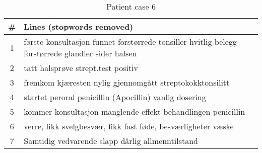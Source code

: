 \begin{table}[htbp] \footnotesize \center
\caption{Patient case 6\label{tab:case6}}
\begin{tabularx}{\textwidth}{c X}
    \toprule
    \# & Lines (stopwords removed) \\
    \midrule
    1 & første konsultasjon funnet forstørrede tonsiller hvitlig belegg forstørrede glandler sider halsen \\
    2 & tatt halsprøve strept.test positiv \\
    3 & fremkom kjæresten nylig gjennomgått streptokokktonsilitt \\
    4 & startet peroral penicillin (Apocillin) vanlig dosering \\
    5 & kommer konsultasjon manglende effekt behandlingen penicillin \\
    6 & verre, fikk svelgbesvær, fikk fast føde, besværligheter væske \\
    7 & Samtidig vedvarende slapp dårlig allmenntilstand \\
    \bottomrule
\end{tabularx}
\end{table}

